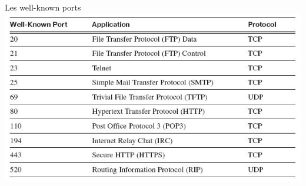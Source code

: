 \documentclass{beamer}
\begin{document}
	\begin{frame}{Les well-known ports}
		\includegraphics[scale=0.7]{wkports.jpg}
	\end{frame}
\end{document}
